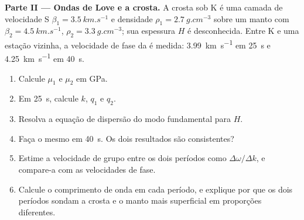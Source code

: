 \begin{problem}
\noindent\textbf{Parte II --- Ondas de Love e a crosta.} A crosta sob K é uma
camada de velocidade S $\beta_1 = \qty{3.5}{km.s^{-1}}$ e densidade
$\rho_1 = \qty{2.7}{g.cm^{-3}}$ sobre um manto com $\beta_2 =
\qty{4.5}{km.s^{-1}}$, $\rho_2 = \qty{3.3}{g.cm^{-3}}$; sua espessura $H$ é
desconhecida. Entre K e uma estação vizinha, a velocidade de fase da  é
medida: \qty{3.99}{km.s^{-1}} em \qty{25}{s} e \qty{4.25}{km.s^{-1}} em
\qty{40}{s}.
\begin{enumerate}[resume]
  \item Calcule $\mu_1$ e $\mu_2$ em \unit{GPa}.
  \item Em \qty{25}{s}, calcule $k$, $q_1$ e $q_2$.
  \item Resolva a equação de dispersão do modo fundamental para $H$.
  \item Faça o mesmo em \qty{40}{s}. Os dois resultados são consistentes?
  \item Estime a velocidade de grupo entre os dois períodos como
        $\Delta\omega/\Delta k$, e compare-a com as velocidades de fase.
  \item Calcule o comprimento de onda em cada período, e explique por que os dois
        períodos sondam a crosta e o manto mais superficial em
        proporções diferentes.
\end{enumerate}


\end{problem}
